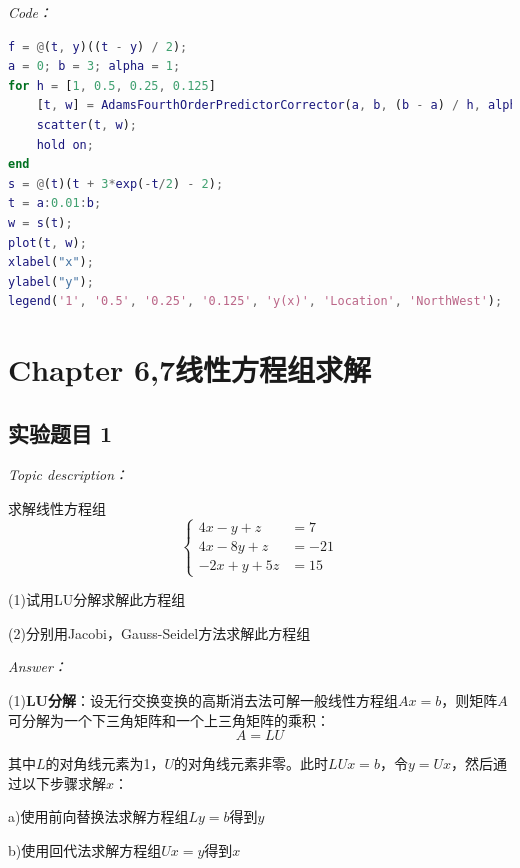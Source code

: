 \documentclass[12pt]{ctexart}
\begin{document}
	\textit{Code：}
	
\begin{lstlisting}[language = MATLAB]
% 第5章 第3题
f = @(t, y)((t - y) / 2);
a = 0; b = 3; alpha = 1;
for h = [1, 0.5, 0.25, 0.125]
	[t, w] = AdamsFourthOrderPredictorCorrector(a, b, (b - a) / h, alpha, f);
	scatter(t, w);
	hold on;
end
s = @(t)(t + 3*exp(-t/2) - 2);
t = a:0.01:b;
w = s(t);
plot(t, w);
xlabel("x");
ylabel("y");
legend('1', '0.5', '0.25', '0.125', 'y(x)', 'Location', 'NorthWest');
\end{lstlisting}
	
\newpage

\newpage
	\section{Chapter 6,7\quad 线性方程组求解}
	\label{sec:6}
	
	\subsection{实验题目 1}
	\textit{Topic description：}
	
	求解线性方程组
	\begin{equation*}
	\left\{
	\begin{aligned}
	4x-y+z&=7 \\
	4x-8y+z&=-21 \\
	-2x+y+5z&=15
	\end{aligned}
	\right.
	\end{equation*}
	
	(1)试用LU分解求解此方程组
	
	(2)分别用Jacobi，Gauss-Seidel方法求解此方程组
	
	\textit{Answer：}
	
	(1)\textbf{LU分解}：设无行交换变换的高斯消去法可解一般线性方程组$Ax=b$，则矩阵$A$可分解为一个下三角矩阵和一个上三角矩阵的乘积：
	\begin{equation*}
	A=LU
	\end{equation*}
	
	其中$L$的对角线元素为1，$U$的对角线元素非零。此时$LUx=b$，令$y=Ux$，然后通过以下步骤求解$x$：
	
	a)使用前向替换法求解方程组$Ly=b$得到$y$
	
	b)使用回代法求解方程组$Ux=y$得到$x$
	
\end{document}
